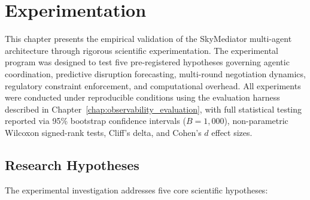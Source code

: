 \chapter{Experimentation}
\label{chap:experimentation}

This chapter presents the empirical validation of the SkyMediator multi-agent architecture through rigorous scientific experimentation. The experimental program was designed to test five pre-registered hypotheses governing agentic coordination, predictive disruption forecasting, multi-round negotiation dynamics, regulatory constraint enforcement, and computational overhead. All experiments were conducted under reproducible conditions using the evaluation harness described in Chapter~\ref{chap:observability_evaluation}, with full statistical testing reported via 95\% bootstrap confidence intervals ($B=1,000$), non-parametric Wilcoxon signed-rank tests, Cliff's delta, and Cohen's $d$ effect sizes.

\section{Research Hypotheses}
\label{sec:hypotheses}

The experimental investigation addresses five core scientific hypotheses:

